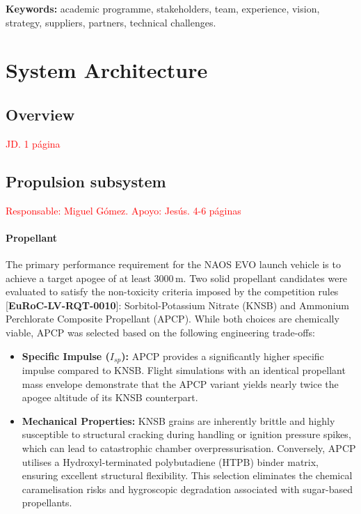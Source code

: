 \documentclass[11pt, a4paper]{article} %
\newcommand{\req}[1]{[\textcolor{EtseNavy}{\textbf{#1}}]}
\begin{document}
\vspace{0.5cm}
\noindent\textbf{Keywords:} academic programme, stakeholders, team, experience, vision, strategy, suppliers, partners, technical challenges.

\section{System Architecture}

\subsection{Overview}  \textcolor{red}{JD. 1 página}

\subsection{Propulsion subsystem}  \textcolor{red}{Responsable: Miguel Gómez. Apoyo: Jesús. 4-6 páginas}

\paragraph{Propellant}
The primary performance requirement for the NAOS EVO launch vehicle is to achieve a target apogee of at least $3000\,\text{m}$. Two solid propellant candidates were evaluated to satisfy the non-toxicity criteria imposed by the competition rules \req{EuRoC-LV-RQT-0010}: Sorbitol-Potassium Nitrate (KNSB) and Ammonium Perchlorate Composite Propellant (APCP). While both choices are chemically viable, APCP was selected based on the following engineering trade-offs:

\begin{itemize}
    \item \textbf{Specific Impulse ($I_{sp}$):} APCP provides a significantly higher specific impulse compared to KNSB. Flight simulations with an identical propellant mass envelope demonstrate that the APCP variant yields nearly twice the apogee altitude of its KNSB counterpart.
    \item \textbf{Mechanical Properties:} KNSB grains are inherently brittle and highly susceptible to structural cracking during handling or ignition pressure spikes, which can lead to catastrophic chamber overpressurisation. Conversely, APCP utilises a Hydroxyl-terminated polybutadiene (HTPB) binder matrix, ensuring excellent structural flexibility. This selection eliminates the chemical caramelisation risks and hygroscopic degradation associated with sugar-based propellants.
\end{itemize}
\end{document}
